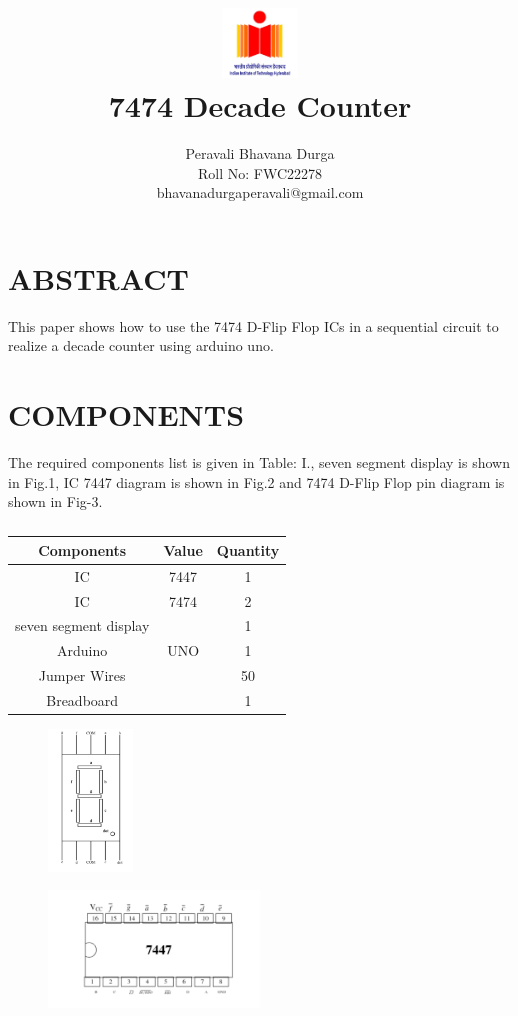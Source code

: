 \documentclass[conference]{IEEEtran}
\title{
\vspace{1cm}
{\includegraphics[width=0.15\textwidth]{iith.jpg} \\ 7474 Decade Counter} }
\author{Peravali Bhavana Durga\\ Roll No: FWC22278 \\ bhavanadurgaperavali@gmail.com}
\begin{document}
\maketitle
 \section {ABSTRACT}
 This paper shows how to use the 7474 D-Flip Flop ICs in a sequential circuit to realize a decade counter using arduino uno.

\section{COMPONENTS}
The required components list is given in Table: I., seven segment display is shown in Fig.1, IC 7447 diagram is shown in Fig.2 and 7474 D-Flip Flop pin diagram is shown in Fig-3.
\vspace{0.3cm}
 \begin{table} [htbp]
\centering
\begin{tabular}{| c | c | c |} \hline
Components & Value & Quantity \\\hline
IC & 7447 & 1 \\ \hline
IC & 7474 & 2 \\ \hline
seven segment display & & 1\\ \hline
Arduino & UNO & 1 \\ \hline
Jumper Wires &  & 50 \\ \hline
Breadboard & & 1 \\
\hline
\end{tabular}
\vspace{0.3cm}
\caption{\label{tab:widgets}}
\end{table}

\begin{figure}[h]
\centering
\includegraphics[width=0.2\textwidth]{seg.jpg}
\caption{\label{fig-1:Gates}}
\end{figure}
\begin{figure}[h]
\centering
\includegraphics[width=0.5\textwidth]{imm.jpg}
\caption{\label{fig-2:Gates}}
\end{figure}
\end{document}
